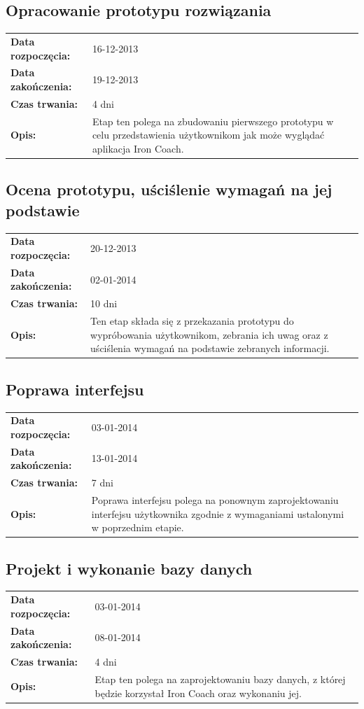 \subsection{Opracowanie prototypu rozwiązania}
	\begin{tabular}{l p{5cm}}
		\textbf{Data rozpoczęcia:} & 16-12-2013\\
		\textbf{Data zakończenia:} & 19-12-2013\\
		\textbf{Czas trwania:} & 4 dni\\
		\textbf{Opis:} & Etap ten polega na zbudowaniu pierwszego prototypu w celu przedstawienia użytkownikom jak może wyglądać aplikacja Iron Coach.
	\end{tabular}
\subsection{Ocena prototypu, uściślenie wymagań na jej podstawie}
	\begin{tabular}{l p{5cm}}
		\textbf{Data rozpoczęcia:} & 20-12-2013\\
		\textbf{Data zakończenia:} & 02-01-2014\\
		\textbf{Czas trwania:} & 10 dni\\
		\textbf{Opis:} & Ten etap składa się z przekazania prototypu do wypróbowania użytkownikom, zebrania ich uwag oraz z uściślenia wymagań na podstawie zebranych informacji.
	\end{tabular}
\subsection{Poprawa interfejsu}
	\begin{tabular}{l p{5cm}}
		\textbf{Data rozpoczęcia:} & 03-01-2014\\
		\textbf{Data zakończenia:} & 13-01-2014\\
		\textbf{Czas trwania:} & 7 dni\\
		\textbf{Opis:} & Poprawa interfejsu polega na ponownym zaprojektowaniu interfejsu użytkownika zgodnie z wymaganiami ustalonymi w poprzednim etapie.
	\end{tabular}
\subsection{Projekt i wykonanie bazy danych}
	\begin{tabular}{l p{5cm}}
		\textbf{Data rozpoczęcia:} & 03-01-2014\\
		\textbf{Data zakończenia:} & 08-01-2014\\
		\textbf{Czas trwania:} & 4 dni\\
		\textbf{Opis:} & Etap ten polega na zaprojektowaniu bazy danych, z której będzie korzystał Iron Coach oraz wykonaniu jej.
	\end{tabular}
